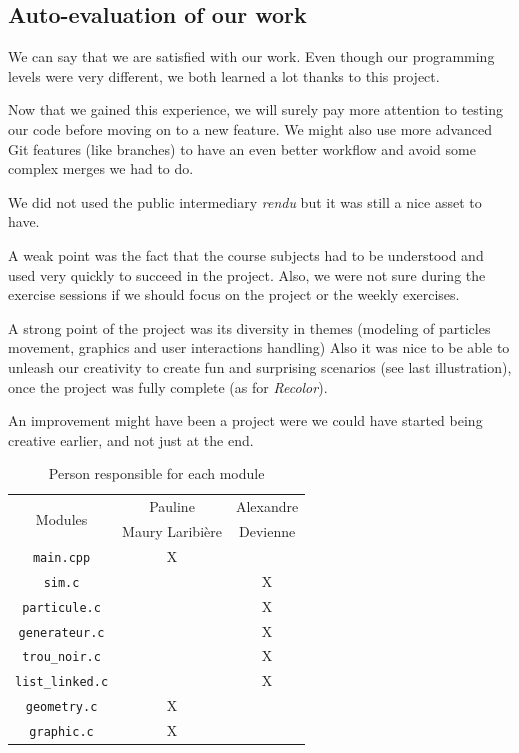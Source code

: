 \documentclass[a4paper]{article} %
\begin{document}
\begin{multicols*}{2}
\subsection{Auto-evaluation of our work}
We can say that we are satisfied with our work.
Even though our programming levels were very different,
we both learned a lot thanks to this project.

Now that we gained this experience, we will surely pay more attention to testing our code
before moving on to a new feature.
We might also use more advanced Git features (like branches) to have an even better workflow and
avoid some complex merges we had to do.

We did not used the public intermediary \emph{rendu} but it was still a nice asset to have.

A weak point was the fact that the course subjects had to be understood
and used very quickly to succeed in the project.
Also, we were not sure during the exercise sessions if we should focus
on the project or the weekly exercises.

A strong point of the project was its diversity in themes (modeling of particles movement, graphics and user interactions handling)
Also it was nice to be able to unleash our creativity to create fun and surprising scenarios (see last illustration),
once the project was fully complete (as for \emph{Recolor}).

An improvement might have been a project were we could have started being creative earlier, and not just at the end.

\begin{table}[H]
\begin{center}
\begin{tabular}{|c|c|c|}
\hline
\multicolumn{1}{|c|}{\multirow{2}{*}{Modules}} & Pauline & Alexandre \\
 & Maury Laribière &  Devienne\\
\hline
\hline
\texttt{main.cpp} &  X &\\
\hline
\texttt{sim.c} & &X\\
\hline
\texttt{particule.c} & & X\\
\hline
\texttt{generateur.c} & & X\\
\hline
\texttt{trou\_noir.c} & & X\\
\hline
\texttt{list\_linked.c} & &X\\
\hline
\texttt{geometry.c} & X&\\
\hline
\texttt{graphic.c} & X&\\
\hline
\end{tabular}
\end{center}
\caption{Person responsible for each module}
\label{tab-module}
\end{table}


\end{multicols*}
\end{document}
